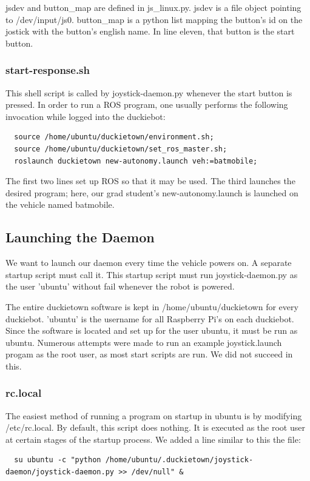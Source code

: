 \documentclass[titlepage]{article}
\begin{document}
jsdev and button\_map are defined in js\_linux.py. jsdev is a file object pointing to /dev/input/js0. button\_map is a python list mapping the button's id on the jostick with the button's english name. In line eleven, that button is the start button. 
\subsubsection{start-response.sh}
This shell script is called by joystick-daemon.py whenever the start button is pressed. In order to run a ROS program, one usually performs the following invocation while logged into the duckiebot:

\begin{lstlisting}
  source /home/ubuntu/duckietown/environment.sh;
  source /home/ubuntu/duckietown/set_ros_master.sh;
  roslaunch duckietown new-autonomy.launch veh:=batmobile;
\end{lstlisting}

The first two lines set up ROS so that it may be used. The third  launches the desired program; here, our grad student's new-autonomy.launch is launched on the vehicle named batmobile.

\subsection{Launching the Daemon} 
We want to launch our daemon every time the vehicle powers on. A separate startup script must call it. This startup script must run joystick-daemon.py as the user 'ubuntu' without fail whenever the robot is powered. 

The entire duckietown software is kept in /home/ubuntu/duckietown for every duckiebot. 'ubuntu' is the username for all Raspberry Pi's on each duckiebot. Since the software is located and set up for the user ubuntu, it must be run as ubuntu. Numerous attempts were made to run an example joystick.launch progam as the root user, as most start scripts are run. We did not succeed in this.

\subsubsection{rc.local}
The easiest method of running a program on startup in ubuntu is by modifying /etc/rc.local. By default, this script does nothing. It is executed as the root user at certain stages of the startup process. We added a line similar to this the file:
\begin{lstlisting}
  su ubuntu -c "python /home/ubuntu/.duckietown/joystick-daemon/joystick-daemon.py >> /dev/null" &                                                            
\end{lstlisting}
\end{document}
